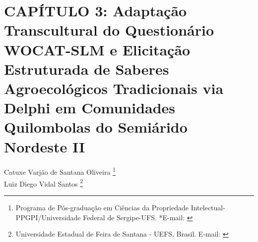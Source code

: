 ﻿\pagestyle{plain}

\chapter{CAPÍTULO 3: Adaptação Transcultural do Questionário WOCAT-SLM e Elicitação Estruturada de Saberes Agroecológicos Tradicionais via Delphi em Comunidades Quilombolas do Semiárido Nordeste II}


\begin{flushright}
Catuxe Varjão de Santana Oliveira  \footnote[1]{Programa de Pós-graduação em Ciências da Propriedade Intelectual-PPGPI/Universidade Federal de Sergipe-UFS. *E-mail:  \href{mailto:catuxe@academico.ufs.br}{}}
\\[0.3cm]
Luiz Diego Vidal Santos \footnote[2]{Universidade Estadual de Feira de Santana - UEFS, Brasil. E-mail: \href{mailto:ldvsantos@uefs.br}{}}
\end{flushright}

